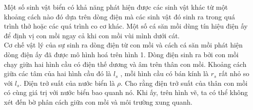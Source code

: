\begin{vd} %
Một số sinh vật biển có khả năng phát hiện được các sinh vật khác từ một khoảng cách nào đó dựa trên dòng điện mà các sinh vật đó sinh ra trong quá trình thở hoặc các quá trình co cơ khác. Một số cá săn mồi dùng tín hiệu điện ấy để định vị con mồi ngay cả khi con mồi vùi mình dưới cát.\\
Cơ chế vật lý của sự sinh ra dòng điện từ con mồi và cách cá săn mồi phát hiện dòng điện ấy đã được mô hình hoá trên hình 1. Dòng điện sinh ra bởi con mồi chạy giữa hai hình cầu có điện thế dương và âm trên thân con mồi. Khoảng cách giữa các tâm của hai hình cầu đó là $l_s$ , mỗi hình cầu có bán kính là $r_s$ rất nhỏ so với $l_s$. Điện trở suất của nước biển là $\rho$. Cho rằng điện trở suất của thân con mồi có cùng giá trị với nước biển bao quanh nó. Khi ấy, trên hình vẽ, ta có thể không xét đến bờ phân cách giữa con mồi và môi trường xung quanh.
\begin{center}
\begin{tikzpicture}[x=0.75pt,y=0.75pt,yscale=-1,xscale=1]


\end{tikzpicture}
\end{center}
\end{vd}
